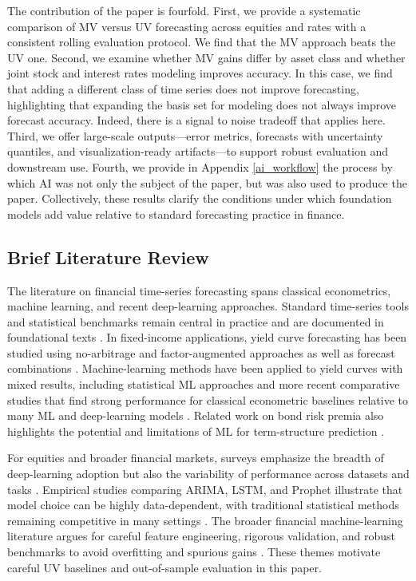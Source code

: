\documentclass[twocolumn]{article}
\begin{document}
The contribution of the paper is fourfold. First, we provide a systematic comparison of MV versus UV forecasting across equities and rates with a consistent rolling evaluation protocol. We find that the MV approach beats the UV one. Second, we examine whether MV gains differ by asset class and whether joint stock and interest rates modeling improves accuracy. In this case, we find that adding a different class of time series does not improve forecasting, highlighting that expanding the basis set for modeling does not always improve forecast accuracy. Indeed, there is a signal to noise tradeoff that applies here. Third, we offer large-scale outputs---error metrics, forecasts with uncertainty quantiles, and visualization-ready artifacts---to support robust evaluation and downstream use. Fourth, we provide in Appendix \ref{ai_workflow} the process by which AI was not only the subject of the paper, but was also used to produce the paper. Collectively, these results clarify the conditions under which foundation models add value relative to standard forecasting practice in finance.

\subsection{Brief Literature Review}

The literature on financial time-series forecasting spans classical econometrics, machine learning, and recent deep-learning approaches. Standard time-series tools and statistical benchmarks remain central in practice and are documented in foundational texts \citep{shumway_time_2025}. In fixed-income applications, yield curve forecasting has been studied using no-arbitrage and factor-augmented approaches \citep{moench_forecasting_2006} as well as forecast combinations \citep{caldeira_predicting_2013}. Machine-learning methods have been applied to yield curves with mixed results, including statistical ML approaches \citep{sambasivan_statistical_2017} and more recent comparative studies that find strong performance for classical econometric baselines relative to many ML and deep-learning models \citep{singh_yield_2025}. Related work on bond risk premia also highlights the potential and limitations of ML for term-structure prediction \citep{bianchi_bond_2020,hoogteijling_forecasting_2021}.

For equities and broader financial markets, surveys emphasize the breadth of deep-learning adoption but also the variability of performance across datasets and tasks \citep{sezer_financial_2019}. Empirical studies comparing ARIMA, LSTM, and Prophet illustrate that model choice can be highly data-dependent, with traditional statistical methods remaining competitive in many settings \citep{sunki_time_2024}. The broader financial machine-learning literature argues for careful feature engineering, rigorous validation, and robust benchmarks to avoid overfitting and spurious gains \citep{lopez_de_prado_advances_2018}. These themes motivate careful UV baselines and out-of-sample evaluation in this paper.
\end{document}
